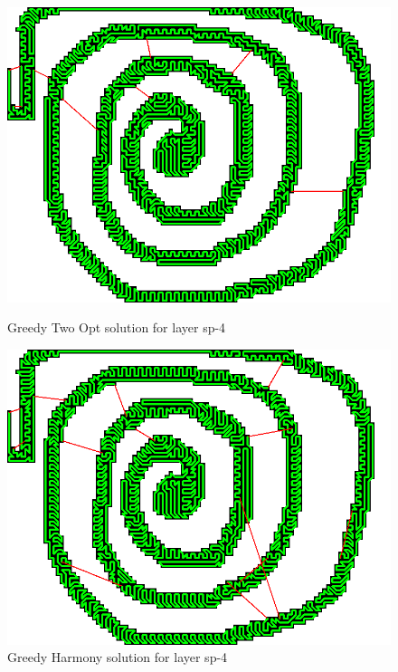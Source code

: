 \documentclass[titlepage]{article}
\newcommand{\multifigcaption}{\captionsetup{justification=justified}}
\begin{document}
\begin{figure}[H]
	\begin{center}
		\begin{minipage}{.45\linewidth}
			\includegraphics[width=\textwidth]{img/results/sp-4-greedy-two-opt.png}
			\multifigcaption
			\caption{Greedy Two Opt solution for layer sp-4}
			\label{img:results/sp-4-greedy-two-opt}
		\end{minipage}
		\hspace{.05\linewidth}
		\begin{minipage}{.45\linewidth}
			\includegraphics[width=\textwidth]{img/results/sp-4-greedy-harmony.png}
			\multifigcaption
			\caption{Greedy Harmony solution for layer sp-4}
			\label{img:results/sp-4-greedy-harmony}
		\end{minipage}
	\end{center}
\end{figure}
\end{document}
